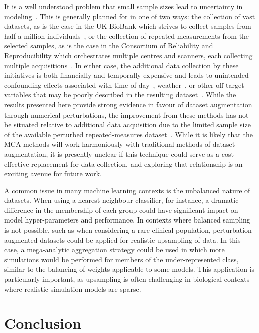\documentclass[10pt]{SelfArx} %
\begin{document}
It is a well understood problem that small sample sizes lead to uncertainty in modeling~\cite{varoquaux2018cross}.
This is generally planned for in one of two ways: the collection of vast datasets, as is the case in the UK-BioBank
which strives to collect samples from half a million individuals~\cite{sudlow2015uk}, or the collection of repeated
measurements from the selected samples, as is the case in the Consortium of Reliability and Reproducibility which
orchestrates multiple centres and scanners, each collecting multiple acquisitions~\cite{zuo2014open}. In either case,
the additional data collection by these initiatives is both financially and temporally expensive and leads to
unintended confounding effects associated with time of day~\cite{vandewalle2009functional},
weather~\cite{di2019estimations}, or other off-target variables that may be poorly described in the resulting
dataset~\cite{chaddock2010neuroimaging}. While the results presented here provide strong evidence in favour of dataset
augmentation through numerical perturbations, the improvement from these methods has not be situated relative to
additional data acquisition due to the limited sample size of the available perturbed repeated-measures
dataset~\cite{Kiar2020-yz}. While it is likely that the MCA methods will work harmoniously with traditional methods of
dataset augmentation, it is presently unclear if this technique could serve as a cost-effective replacement for data
collection, and exploring that relationship is an exciting avenue for future work.

A common issue in many machine learning contexts is the unbalanced nature of datasets. When using a nearest-neighbour
classifier, for instance, a dramatic difference in the membership of each group could have significant impact on model
hyper-parameters and performance. In contexts where balanced sampling is not possible, such as when considering a rare
clinical population, perturbation-augmented datasets could be applied for realistic upsampling of data. In this case, a
mega-analytic aggregation strategy could be used in which more simulations would be performed for members of the
under-represented class, similar to the balancing of weights applicable to some models. This application is
particularly important, as upsampling is often challenging in biological contexts where realistic simulation models are
sparse.


\section*{Conclusion}
\end{document}
